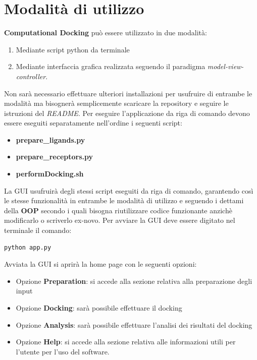 \section{Modalità di utilizzo}
\textbf{Computational Docking} può essere utilizzato in due modalità:

\begin{enumerate}[label=\arabic{*}., ref=(\arabic{*})]
    \item Mediante script python da terminale
    \item Mediante interfaccia grafica realizzata seguendo il paradigma \textit{model-view-controller}.
\end{enumerate}

Non sarà necessario effettuare ulteriori installazioni per usufruire di entrambe le modalità ma bisognerà semplicemente scaricare la repository e seguire le istruzioni del \textit{README}.\newline
Per eseguire l'applicazione da riga di comando devono essere eseguiti separatamente nell'ordine i seguenti script:

\begin{itemize}
    \item \textbf{prepare\_ligands.py}
    \item \textbf{prepare\_receptors.py}
    \item \textbf{performDocking.sh}
\end{itemize}

La GUI usufruirà degli stessi script eseguiti da riga di comando, garantendo così le stesse funzionalità in entrambe le modalità di utilizzo e seguendo i dettami della \textbf{OOP} secondo i quali bisogna riutilizzare codice funzionante anzichè modificarlo o scriverlo ex-novo.\newline
Per avviare la GUI deve essere digitato nel terminale il comando:

\begin{lstlisting}[language=bash, label=lst:code2, caption={Comando per avviare la GUI}]
python app.py    
\end{lstlisting}

Avviata la GUI si aprirà la home page con le seguenti opzioni:

\begin{itemize}
    \item Opzione \textbf{Preparation}: si accede alla sezione relativa alla preparazione degli input
    \item Opzione \textbf{Docking}: sarà possibile effettuare il docking
    \item Opzione \textbf{Analysis}: sarà possibile effettuare l'analisi dei risultati del docking
    \item Opzione \textbf{Help}: si accede alla sezione relativa alle informazioni utili per l'utente per l'uso del software.
\end{itemize}

